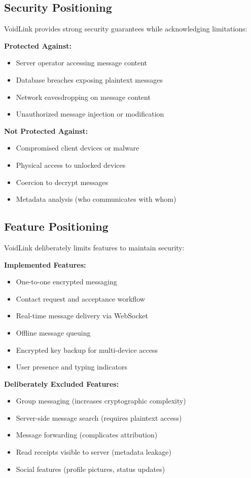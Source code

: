 \subsection{Security Positioning}

VoidLink provides strong security guarantees while acknowledging limitations:

\textbf{Protected Against:}
\begin{itemize}
    \item Server operator accessing message content
    \item Database breaches exposing plaintext messages
    \item Network eavesdropping on message content
    \item Unauthorized message injection or modification
\end{itemize}

\textbf{Not Protected Against:}
\begin{itemize}
    \item Compromised client devices or malware
    \item Physical access to unlocked devices
    \item Coercion to decrypt messages
    \item Metadata analysis (who communicates with whom)
\end{itemize}

\subsection{Feature Positioning}

VoidLink deliberately limits features to maintain security:

\textbf{Implemented Features:}
\begin{itemize}
    \item One-to-one encrypted messaging
    \item Contact request and acceptance workflow
    \item Real-time message delivery via WebSocket
    \item Offline message queuing
    \item Encrypted key backup for multi-device access
    \item User presence and typing indicators
\end{itemize}

\textbf{Deliberately Excluded Features:}
\begin{itemize}
    \item Group messaging (increases cryptographic complexity)
    \item Server-side message search (requires plaintext access)
    \item Message forwarding (complicates attribution)
    \item Read receipts visible to server (metadata leakage)
    \item Social features (profile pictures, status updates)
\end{itemize}

